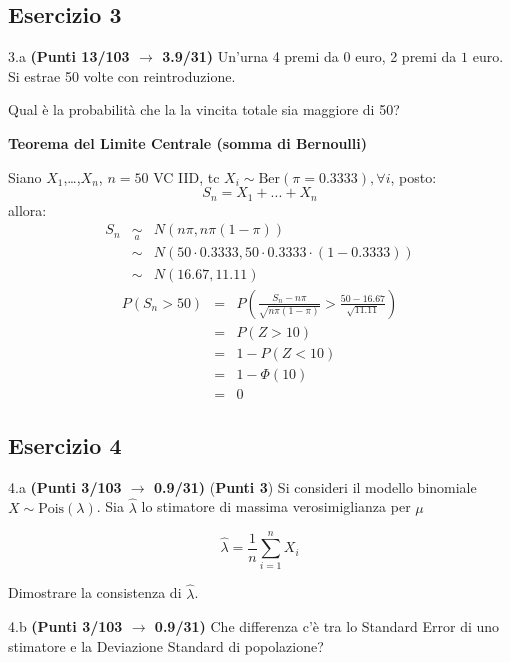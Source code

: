 \documentclass[
  11pt,
]{book}
\theoremstyle{mytheoremstyle}
\theoremstyle{mydefstyle}
\newenvironment{sol}
  {
  \begin{tcolorbox}[enhanced,breakable,arc=0.1mm,boxrule=1pt,colback=white,colframe=iblue,
  title=\bf \fontfamily{lmss}\selectfont \hspace{.5 cm} Soluzione,drop fuzzy shadow]

}{
\end{tcolorbox}
  }
\begin{document}
\subsection{Esercizio 3}\label{esercizio-3-35}

3.a \textbf{(Punti 13/103 \(\rightarrow\) 3.9/31)} Un'urna 4 premi da \(\mbox{0}\) euro, 2 premi da \(\mbox{1}\) euro.
Si estrae 50 volte con reintroduzione.

Qual è la probabilità che la la vincita totale sia maggiore di 50?

\begin{sol}
\textbf{Teorema del Limite Centrale (somma di Bernoulli)}

Siano \(X_1\),\ldots,\(X_n\), \(n=50\) VC IID, tc \(X_i\sim\text{Ber}(\pi=0.3333)\)\(,\forall i\), posto:
\[
      S_n = X_1 + ... + X_n
      \]
allora:\begin{eqnarray*}
  S_n & \mathop{\sim}\limits_{a}& N(n\pi,n\pi(1-\pi)) \\
      &\sim & N(50\cdot0.3333,50\cdot0.3333\cdot(1-0.3333)) \\
      &\sim & N(16.67,11.11)
  \end{eqnarray*}\begin{eqnarray*}
      P( S_n   >   50 ) 
        &=& P\left(  \frac { S_n  -  n\pi }{ \sqrt{n\pi(1-\pi)} }  >  \frac { 50  -  16.67 }{\sqrt{ 11.11 }} \right)  \\
                 &=& P\left(  Z   >   10 \right) \\    &=& 1-P(Z< 10 )\\ 
                 &=&  1-\Phi( 10 ) \\ &=&  0 
      \end{eqnarray*}

\end{sol}

\subsection{Esercizio 4}\label{esercizio-4-35}

4.a \textbf{(Punti 3/103 \(\rightarrow\) 0.9/31)} (\textbf{Punti 3}) Si consideri il modello binomiale \(X\sim\text{Pois}(\lambda)\). Sia \(\hat\lambda\) lo stimatore di massima verosimiglianza per \(\mu\)

\[
  \hat\lambda = \frac 1n \sum_{i=1}^n X_i
\]

Dimostrare la consistenza di \(\hat\lambda\).

4.b \textbf{(Punti 3/103 \(\rightarrow\) 0.9/31)} Che differenza c'è tra lo Standard Error di uno stimatore e la Deviazione Standard di popolazione?
\end{document}
